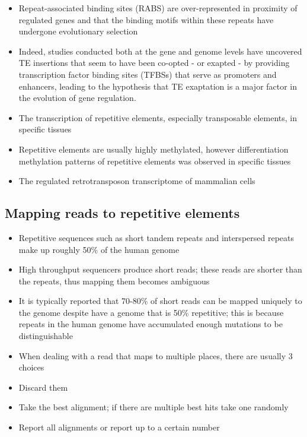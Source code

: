 \begin{itemize}
   \item Repeat-associated binding sites (RABS) are over-represented in proximity of regulated genes and that the binding motifs within these repeats have undergone evolutionary selection
   \item Indeed, studies conducted both at the gene and genome levels have uncovered TE insertions that seem to have been co-opted - or exapted - by providing transcription factor binding sites (TFBSs) that serve as promoters and enhancers, leading to the hypothesis that TE exaptation is a major factor in the evolution of gene regulation.
   \item The transcription of repetitive elements, especially transposable elements, in specific tissues
   \item Repetitive elements are usually highly methylated, however differentiation methylation patterns of repetitive elements was observed in specific tissues
   \item The regulated retrotransposon transcriptome of mammalian cells\cite{pmid19377475}
\end{itemize}

\subsection{Mapping reads to repetitive elements}

\begin{itemize}
   \item Repetitive sequences such as short tandem repeats and interspersed repeats make up roughly 50\% of the human genome
   \item High throughput sequencers produce short reads; these reads are shorter than the repeats, thus mapping them becomes ambiguous
   \item It is typically reported that 70-80\% of short reads can be mapped uniquely to the genome despite have a genome that is 50\% repetitive; this is because repeats in the human genome have accumulated enough mutations to be distinguishable
   \item When dealing with a read that maps to multiple places, there are usually 3 choices
   \item Discard them
   \item Take the best alignment; if there are multiple best hits take one randomly
   \item Report all alignments or report up to a certain number
\end{itemize}

